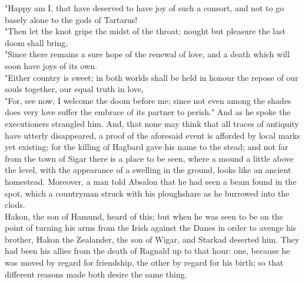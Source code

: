 \documentclass[10pt,a4paper]{report}
\begin{document}
"Happy am I, that have deserved to have joy of such a consort, and not to go basely alone to the gods of Tartarus!\\

"Then let the knot gripe the midst of the throat; nought but pleasure the last doom shall bring,\\

"Since there remains a sure hope of the renewal of love, and a death which will soon have joys of its own.\\

"Either country is sweet; in both worlds shall be held in honour the repose of our souls together, our equal truth in love,\\

"For, see now, I welcome the doom before me; since not even among the shades does very love suffer the embrace of its partner to perish." And as he spoke the executioners strangled him. And, that none may think that all traces of antiquity have utterly disappeared, a proof of the aforesaid event is afforded by local marks yet existing; for the killing of Hagbard gave his name to the stead; and not far from the town of Sigar there is a place to be seen, where a mound a little above the level, with the appearance of a swelling in the ground, looks like an ancient homestead. Moreover, a man told Absalon that he had seen a beam found in the spot, which a countryman struck with his ploughshare as he burrowed into the clods.\\

Hakon, the son of Hamund, heard of this; but when he was seen to be on the point of turning his arms from the Irish against the Danes in order to avenge his brother, Hakon the Zealander, the son of Wigar, and Starkad deserted him. They had been his allies from the death of Ragnald up to that hour: one, because he was moved by regard for friendship, the other by regard for his birth; so that different reasons made both desire the same thing.\\
\end{document}
